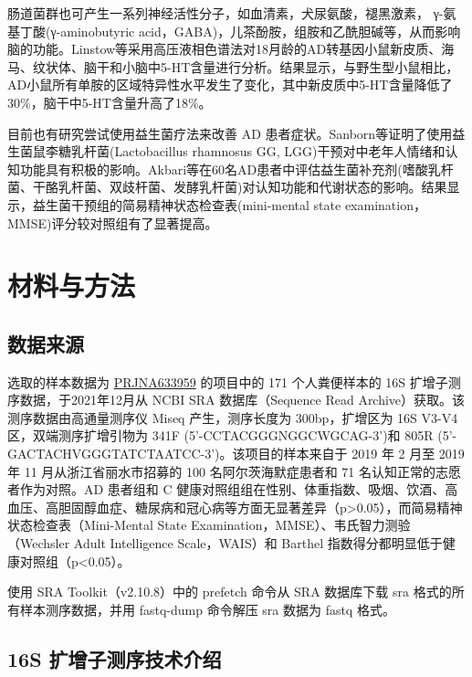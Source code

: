 \documentclass[supercite]{HustGraduPaper}
\begin{document}
肠道菌群也可产生一系列神经活性分子，如血清素，犬尿氨酸，褪黑激素， γ-氨基丁酸(γ-aminobutyric acid，GABA)，儿茶酚胺，组胺和乙酰胆碱等\cite{barrett2012gamma}\cite{lyte2011probiotics}，从而影响脑的功能。Linstow等\cite{von2017effect}采用高压液相色谱法对18月龄的AD转基因小鼠新皮质、海马、纹状体、脑干和小脑中5-HT含量进行分析。结果显示，与野生型小鼠相比，AD小鼠所有单胺的区域特异性水平发生了变化，其中新皮质中5-HT含量降低了30\%，脑干中5-HT含量升高了18\%。

目前也有研究尝试使用益生菌疗法来改善 AD 患者症状。Sanborn等\cite{sanborn2018randomized}证明了使用益生菌鼠李糖乳杆菌(Lactobacillus rhamnosus GG, LGG)干预对中老年人情绪和认知功能具有积极的影响。Akbari等\cite{akbari2016effect}在60名AD患者中评估益生菌补充剂(嗜酸乳杆菌、干酪乳杆菌、双歧杆菌、发酵乳杆菌)对认知功能和代谢状态的影响。结果显示，益生菌干预组的简易精神状态检查表(mini-mental state examination，MMSE)评分较对照组有了显著提高。



\section{材料与方法}

\subsection{数据来源}

选取的样本数据为 \href{https://www.ncbi.nlm.nih.gov/bioproject/PRJNA633959}{ PRJNA633959} 的项目中的 171 个人粪便样本的 16S 扩增子测序数据\cite{data}，于2021年12月从 NCBI SRA 数据库（Sequence Read Archive）获取。该测序数据由高通量测序仪 Miseq 产生，测序长度为 300bp，扩增区为 16S V3-V4 区，双端测序扩增引物为 341F (5'-CCTACGGGNGGCWGCAG-3')和 805R (5'-GACTACHVGGGTATCTAATCC-3')。该项目的样本来自于 2019 年 2 月至 2019 年 11 月从浙江省丽水市招募的 100 名阿尔茨海默症患者和 71 名认知正常的志愿者作为对照。AD 患者组和 C 健康对照组组在性别、体重指数、吸烟、饮酒、高血压、高胆固醇血症、糖尿病和冠心病等方面无显著差异（p>0.05），而简易精神状态检查表（Mini-Mental State Examination，MMSE）、韦氏智力测验 （Wechsler Adult Intelligence Scale，WAIS）和 Barthel 指数得分都明显低于健康对照组（p<0.05）。

使用 SRA Toolkit\cite{leinonen2010sequence}（v2.10.8）中的 prefetch 命令从 SRA 数据库下载 sra 格式的所有样本测序数据，并用 fastq-dump 命令解压 sra 数据为 fastq 格式。

\subsection{16S 扩增子测序技术介绍}
\end{document}
